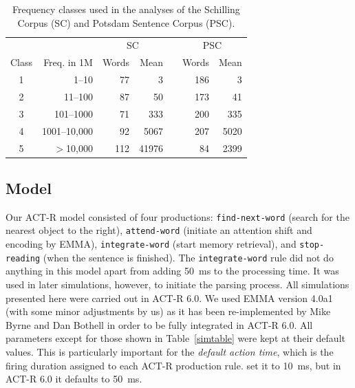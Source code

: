 \documentclass{cambridge7A}\usepackage[]{graphicx}\usepackage[]{color}
\begin{document}
\begin{table}[!htbp]
\centering
\begin{tabular}{crrrrrr} 
\hline
  &  & \multicolumn{2}{c}{SC} & & \multicolumn{2}{c}{PSC} \\ \cline{3-4} \cline{6-7}
  Class & Freq. in 1M & Words & Mean & & Words & Mean   \\ 
\hline
  1     & 1--10   & 77  & 3     & & 186 & 3         \\
  2     &  11--100 & 87  & 50    & & 173 & 41        \\
  3     &  101--1000 & 71  & 333   & & 200 & 335       \\
  4     &  1001--10,000 & 92  & 5067  & & 207 & 5020      \\
  5     &  $>$10,000  & 112 & 41976 & & 84  & 2399      \\ 
\hline
\end{tabular}
\caption{Frequency classes used in the analyses of the Schilling Corpus (SC) and Potsdam Sentence Corpus (PSC).}
\label{classtable}
\end{table}

\subsection{Model}
Our ACT-R model consisted of four productions:  \texttt{find-next-word} (search for the nearest object to the right),  \texttt{attend-word} (initiate an attention shift and encoding by EMMA),  \texttt{integrate-word} (start memory retrieval), and  \texttt{stop-reading} (when the sentence is finished).  The \texttt{integrate-word} rule did not do anything in this model apart from adding 50~ms to the processing time. It was used in later simulations, however, to initiate the parsing process.
All simulations presented here were carried out in ACT-R 6.0. We used EMMA version 4.0a1 (with some minor adjustments by us) as it has been re-implemented by Mike Byrne and Dan Bothell in order to be fully integrated in ACT-R 6.0.  All parameters except for those shown in Table~\ref{simtable} were kept at their default values.  This is particularly important for the \emph{default action time}, which is the firing duration assigned to each ACT-R production rule. \cite{Salvucci2001} set it to 10~ms, but in ACT-R 6.0 it defaults to 50~ms.
\end{document}
